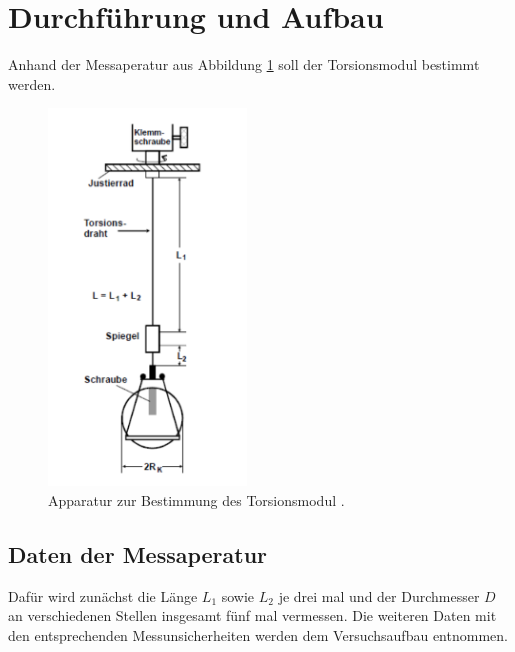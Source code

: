 \section{Durchführung und Aufbau}
\label{sec:Durchführung}
Anhand der Messaperatur aus Abbildung \ref{fig:Mess} soll der Torsionsmodul bestimmt werden.
\begin{figure}
  \centering
  \includegraphics[height=10cm]{picture/Messapperatur.png}
  \caption{Apparatur zur Bestimmung des Torsionsmodul \cite{sample}.}
  \label{fig:Mess}
\end{figure}
\subsection{Daten der Messaperatur}
Dafür wird zunächst die Länge $L_1$ sowie $L_2$ je drei mal und der Durchmesser $D$ an verschiedenen Stellen insgesamt fünf mal vermessen. Die weiteren Daten mit den entsprechenden Messunsicherheiten werden dem Versuchsaufbau entnommen.
